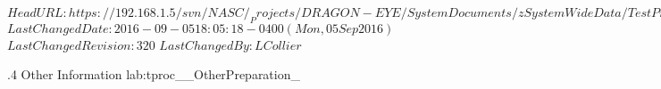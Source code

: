 \svnidlong
{$HeadURL: https://192.168.1.5/svn/NASC/_Projects/DRAGON-EYE/SystemDocuments/zSystemWideData/TestPrepProcs/TestCasePrep_OtherInformation.tex $}
{$LastChangedDate: 2016-09-05 18:05:18 -0400 (Mon, 05 Sep 2016) $}
{$LastChangedRevision: 320 $}
{$LastChangedBy: LCollier $}

\TestProcedure  %
{\TestProcNumber.4}
{\StdTestNameX Other Information}
{lab:tproc_\StdTestName_OtherPreparation_\TestProcNumber}
{
}
{
}
{
}
